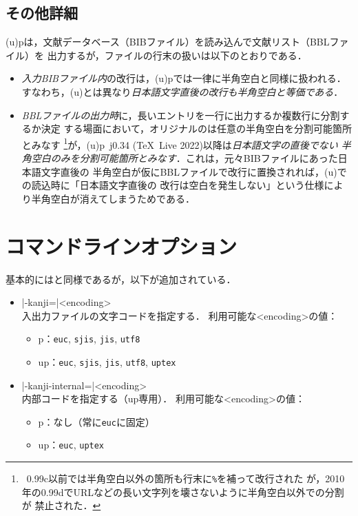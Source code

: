 \documentclass[a4paper,11pt,nomag,dvipdfmx]{jsarticle}
\def\code#1{\texttt{#1}}
\def\pBibTeX{p\kern-.05em\BibTeX}
\def\upBibTeX{u\pBibTeX}
\def\pBibTeX{p\BibTeX}%
\def\upBibTeX{u\pBibTeX}%
\begin{document}
\subsection{その他詳細}\label{sec:jnewline}

(u)\pBibTeX は，文献データベース（BIBファイル）を読み込んで文献リスト（BBLファイル）を
出力するが，ファイルの行末の扱いは以下のとおりである．%
\begin{itemize}
 \item \emph{入力BIBファイル内}の改行は，(u)\pBibTeX では一律に半角空白と同様に扱われる．
   すなわち，(u)\pTeX とは異なり\emph{日本語文字直後の改行も半角空白と等価である}．
 \item \emph{BBLファイルの出力時}に，長いエントリを一行に出力するか複数行に分割するか決定
   する場面において，オリジナルの\BibTeX は任意の半角空白を分割可能箇所とみなす
   \footnote{\BibTeX~0.99c以前では半角空白以外の箇所も行末に\code{\%}を補って改行された
   が，2010年の0.99dでURLなどの長い文字列を壊さないように半角空白以外での分割が
   禁止された．}が，(u)\pBibTeX~j0.34 (\TeX~Live 2022)以降は\emph{日本語文字の直後でない
   半角空白のみを分割可能箇所とみなす}．これは，元々BIBファイルにあった日本語文字直後の
   半角空白が仮にBBLファイルで改行に置換されれば，(u)\pTeX での読込時に「日本語文字直後の
   改行は空白を発生しない」という仕様により半角空白が消えてしまうためである\cite{tjb132}．
\end{itemize}


\section{コマンドラインオプション}

基本的には\BibTeX と同様であるが，以下が追加されている．
\begin{itemize}
 \item |-kanji=|<encoding>\\
   入出力ファイルの文字コードを指定する．
   利用可能な<encoding>の値：
   \begin{itemize}
    \item \pBibTeX ：\code{euc}, \code{sjis}, \code{jis}, \code{utf8}
    \item \upBibTeX ：\code{euc}, \code{sjis}, \code{jis}, \code{utf8}, \code{uptex}
   \end{itemize}
 \item |-kanji-internal=|<encoding>\\
   内部コードを指定する（\upBibTeX 専用）．
   利用可能な<encoding>の値：
   \begin{itemize}
    \item \pBibTeX ：なし（常に\code{euc}に固定）
    \item \upBibTeX ：\code{euc}, \code{uptex}
   \end{itemize}
\end{itemize}
\end{document}
